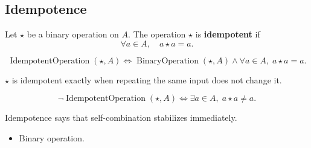 \subsection*{Idempotence}
\label{subsec:idempotence}

\begin{definition}
\label{def:idempotent-operation}
Let $\star$ be a binary operation on $A$.
The operation $\star$ is \textbf{idempotent} if
\[
\forall a \in A,\quad a \star a = a.
\]
\end{definition}

\begin{remark*}
\[
\operatorname{IdempotentOperation}(\star,A)
\Longleftrightarrow
\operatorname{BinaryOperation}(\star,A)
\land
\forall a\in A,\; a\star a=a.
\]
\end{remark*}

\begin{remark*}
$\star$ is idempotent exactly when repeating the same input does not change it.
\end{remark*}

\begin{remark*}
\[
\neg\operatorname{IdempotentOperation}(\star,A)
\Longleftrightarrow
\exists a\in A,\; a\star a\neq a.
\]
\end{remark*}

\begin{remark*}[Interpretation]
Idempotence says that self-combination stabilizes immediately.
\end{remark*}

\begin{remark*}[Dependencies]
\begin{itemize}
  \item Binary operation.
\end{itemize}
\end{remark*}

